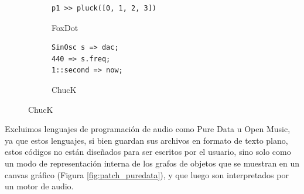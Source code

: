 \begin{figure}[H]
    \vspace{5mm} %
    
    \begin{subfigure}{.48\textwidth}
      \centering
      \begin{mdframed}
        \fontsize{9.5pt}{11pt}\selectfont
      \begin{verbatim}
p1 >> pluck([0, 1, 2, 3])
      \end{verbatim}
      \end{mdframed}
      \caption{FoxDot}
    \end{subfigure}\hfill
    \begin{subfigure}{.48\textwidth}
      \centering
      \begin{mdframed}
        \fontsize{9.5pt}{11pt}\selectfont
      \begin{verbatim}
SinOsc s => dac;
440 => s.freq;
1::second => now;
      \end{verbatim}
      \end{mdframed}
      \caption{ChucK}
    \end{subfigure}

    \label{fig:hola_mundo}
\end{figure}

Excluimos lenguajes de programación de audio como Pure Data u Open Music, ya que estos lenguajes, si bien guardan sus archivos en formato de texto plano, estos códigos no están diseñados para ser escritos por el usuario, sino solo como un modo de representación interna de los grafos de objetos que se muestran en un canvas gráfico (Figura \ref{fig:patch_puredata}), y que luego son interpretados por un motor de audio. 


